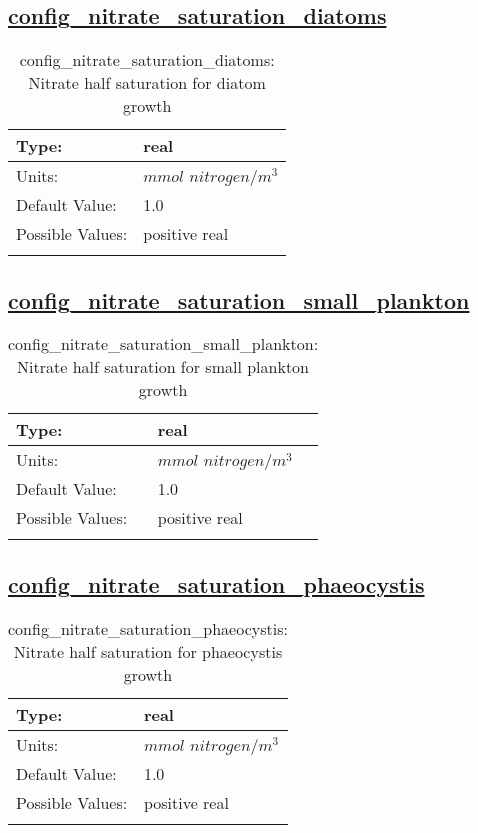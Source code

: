 \subsection[config\_nitrate\_saturation\_diatoms]{\hyperref[sec:nm_tab_biogeochemistry]{config\_nitrate\_saturation\_diatoms}}
\label{subsec:nm_sec_config_nitrate_saturation_diatoms}
\begin{center}
\begin{longtable}{| p{2.0in} || p{4.0in} |}
    \hline
    Type: & real \\
    \hline
    Units: & $mmol$ $nitrogen/m^3$ \\
    \hline
    Default Value: & 1.0 \\
    \hline
    Possible Values: & positive real \\
    \hline
    \caption{config\_nitrate\_saturation\_diatoms: Nitrate half saturation for diatom growth}
\end{longtable}
\end{center}
\subsection[config\_nitrate\_saturation\_small\_plankton]{\hyperref[sec:nm_tab_biogeochemistry]{config\_nitrate\_saturation\_small\_plankton}}
\label{subsec:nm_sec_config_nitrate_saturation_small_plankton}
\begin{center}
\begin{longtable}{| p{2.0in} || p{4.0in} |}
    \hline
    Type: & real \\
    \hline
    Units: & $mmol$ $nitrogen/m^3$ \\
    \hline
    Default Value: & 1.0 \\
    \hline
    Possible Values: & positive real \\
    \hline
    \caption{config\_nitrate\_saturation\_small\_plankton: Nitrate half saturation for small plankton growth}
\end{longtable}
\end{center}
\subsection[config\_nitrate\_saturation\_phaeocystis]{\hyperref[sec:nm_tab_biogeochemistry]{config\_nitrate\_saturation\_phaeocystis}}
\label{subsec:nm_sec_config_nitrate_saturation_phaeocystis}
\begin{center}
\begin{longtable}{| p{2.0in} || p{4.0in} |}
    \hline
    Type: & real \\
    \hline
    Units: & $mmol$ $nitrogen/m^3$ \\
    \hline
    Default Value: & 1.0 \\
    \hline
    Possible Values: & positive real \\
    \hline
    \caption{config\_nitrate\_saturation\_phaeocystis: Nitrate half saturation for phaeocystis growth}
\end{longtable}
\end{center}
